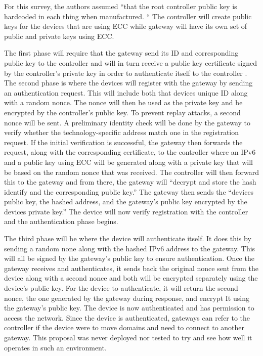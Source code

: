 For this survey, the authors assumed “that the root controller public key is hardcoded in each thing when manufactured. “\cite {salman2016identity} The controller will create public keys for the devices that are using ECC while gateway will have its own set of public and private keys using ECC. 

\smallskip

The first phase will require that the gateway send its ID and corresponding public key to the controller and will in turn receive a public key certificate signed by the controller’s private key in order to authenticate itself to the controller \cite {salman2016identity}. The second phase is where the devices will register with the gateway by sending an authentication request. This will include both that devices unique ID along with a random nonce. The nonce will then be used as the private key and be encrypted by the controller’s public key. To prevent replay attacks, a second nonce will be sent. A preliminary identity check will be done by the gateway to verify whether the technology-specific address match one in the registration request. \cite {salman2016identity} If the initial verification is successful, the gateway then forwards the request, along with the corresponding certificate, to the controller where an IPv6 and a public key using ECC will be generated along with a private key that will be based on the random nonce that was received. The controller will then forward this to the gateway and from there, the gateway will “decrypt and store the hash identify and the corresponding public key.” \cite {salman2016identity} The gateway then sends the “devices public key, the hashed address, and the gateway’s public key encrypted by the devices private key.” \cite {salman2016identity} The device will now verify registration with the controller and the authentication phase begins.

\smallskip

The third phase will be where the device will authenticate itself. It does this by sending a random none along with the hashed IPv6 address to the gateway. This will all be signed by the gateway’s public key to ensure authentication. Once the gateway receives and authenticates, it sends back the original nonce sent from the device along with a second nonce and both will be encrypted separately using the device’s public key. For the device to authenticate, it will return the second nonce, the one generated by the gateway during response, and encrypt It using the gateway’s public key. The device is now authenticated and has permission to access the network. Since the device is authenticated, gateways can refer to the controller if the device were to move domains and need to connect to another gateway. 
This proposal was never deployed nor tested to try and see how well it operates in such an environment. 

